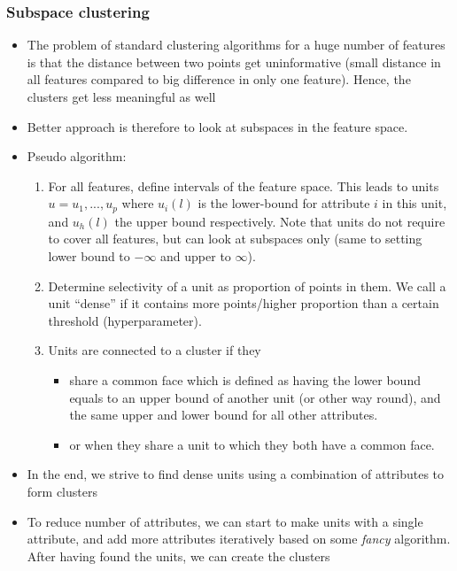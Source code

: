 \subsubsection{Subspace clustering}
\begin{itemize}
	\item The problem of standard clustering algorithms for a huge number of features is that the distance between two points get uninformative (small distance in all features compared to big difference in only one feature). Hence, the clusters get less meaningful as well
	\item Better approach is therefore to look at subspaces in the feature space.
	\item Pseudo algorithm:
	\begin{enumerate}
		\item For all features, define intervals of the feature space. This leads to units $u={u_1, ..., u_p}$ where $u_i(l)$ is the lower-bound for attribute $i$ in this unit, and $u_h(l)$ the upper bound respectively. Note that units do not require to cover all features, but can look at subspaces only (same to setting lower bound to $-\infty$ and upper to $\infty$). 
		\item Determine selectivity of a unit as proportion of points in them. We call a unit ``dense'' if it contains more points/higher proportion than a certain threshold (hyperparameter).
		\item Units are connected to a cluster if they 
		\begin{itemize}
			\item share a common face which is defined as having the lower bound equals to an upper bound of another unit (or other way round), and the same upper and lower bound for all other attributes. 
			\item or when they share a unit to which they both have a common face.
		\end{itemize}
	\end{enumerate}
	\item In the end, we strive to find dense units using a combination of attributes to form clusters
	\item To reduce number of attributes, we can start to make units with a single attribute, and add more attributes iteratively based on some \textit{fancy} algorithm. After having found the units, we can create the clusters
\end{itemize}